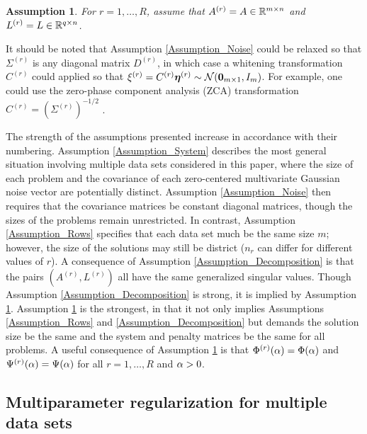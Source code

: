 \documentclass[12pt]{article}
\newtheorem{assumption}{Assumption}
\begin{document}
\begin{assumption}
\label{Assumption_Matrices}
For $r = 1,\ldots,R$, assume that $A^{(r)} = A \in \mathbb{R}^{m \times n}$ and $L^{(r)} = L \in \mathbb{R}^{q \times n}$.
\end{assumption}  

\noindent It should be noted that Assumption \ref{Assumption_Noise} could be relaxed so that $\Sigma^{(r)}$ is any diagonal matrix $D^{(r)}$, in which case a whitening transformation $C^{(r)}$ could applied so that $\xi^{(r)} = C^{(r)}\bm{\eta}^{(r)} \sim \mathcal{N}(\bm{0}_{m \times 1},I_{m})$. For example, one could use the zero-phase component analysis (ZCA) transformation $C^{(r)} = \left(\Sigma^{(r)}\right)^{-1/2}$ \cite{BellSejnowski}. \par
The strength of the assumptions presented increase in accordance with their numbering. Assumption \ref{Assumption_System} describes the most general situation involving multiple data sets considered in this paper, where the size of each problem and the covariance of each zero-centered multivariate Gaussian noise vector are potentially distinct. Assumption \ref{Assumption_Noise} then requires that the covariance matrices be constant diagonal matrices, though the sizes of the problems remain unrestricted. In contrast, Assumption \ref{Assumption_Rows} specifies that each data set much be the same size $m$; however, the size of the solutions may still be district ($n_r$ can differ for different values of $r$). A consequence of Assumption \ref{Assumption_Decomposition} is that the pairs $(A^{(r)},L^{(r)})$ all have the same generalized singular values. Though Assumption \ref{Assumption_Decomposition} is strong, it is implied by Assumption \ref{Assumption_Matrices}. Assumption \ref{Assumption_Matrices} is the strongest, in that it not only implies Assumptions \ref{Assumption_Rows} and \ref{Assumption_Decomposition} but demands the solution size be the same and the system and penalty matrices be the same for all problems. A useful consequence of Assumption \ref{Assumption_Matrices} is that $\Phi^{(r)}(\alpha) = \Phi(\alpha)$ and $\Psi^{(r)}(\alpha) = \Psi(\alpha)$ for all $r = 1,\ldots,R$ and $\alpha > 0$.

\subsection{Multiparameter regularization for multiple data sets} \label{sec:Adapted regularization}
\end{document}
